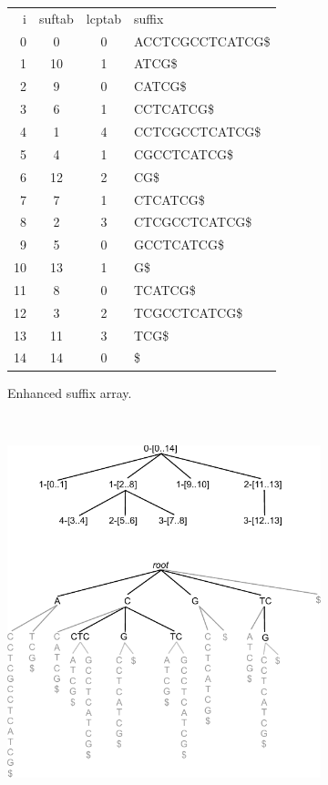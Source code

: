 \begin{figure}[htp]
\centering

\begin{subfigure}[m]{0.47\textwidth}
\scriptsize
\begin{tabular}{rccl}
    i & suftab & lcptab & suffix\\
    0 & 0 & 0 & ACCTCGCCTCATCG\$ \\
    1 & 10 & 1 & ATCG\$ \\
    2 & 9 & 0 & CATCG\$ \\
    3 & 6 & 1 & CCTCATCG\$ \\
    4 & 1 & 4 & CCTCGCCTCATCG\$ \\
    5 & 4 & 1 & CGCCTCATCG\$ \\
    6 & 12 & 2 & CG\$ \\
    7 & 7 & 1 & CTCATCG\$ \\
    8 & 2 & 3 & CTCGCCTCATCG\$ \\
    9 & 5 & 0 & GCCTCATCG\$ \\
    10 & 13 & 1 & G\$ \\
    11 & 8 & 0 & TCATCG\$ \\
    12 & 3 & 2 & TCGCCTCATCG\$ \\
    13 & 11 & 3 & TCG\$ \\
    14 & 14 & 0 & \$
\end{tabular}
\caption{Enhanced suffix array.}
\end{subfigure}
~\begin{subfigure}[m]{0.47\textwidth}
   \centering
   \includegraphics[width=\textwidth]{../figures/lcpintervaltree}

\end{subfigure}
\end{figure}
